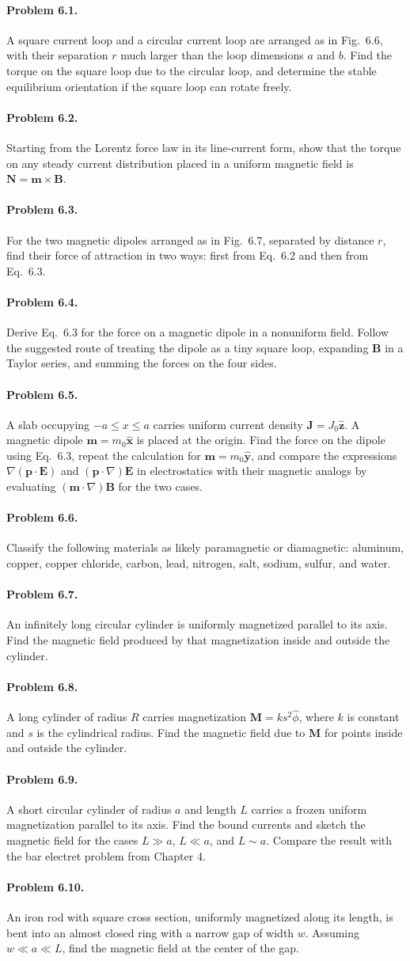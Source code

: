 \documentclass{aa}
\newcommand{\problemstatement}[2]{%
\paragraph{Problem #1.}#2\par\medskip
}
\begin{document}
\problemstatement{6.1}{A square current loop and a circular current loop are arranged as in Fig.~6.6, with their separation \(r\) much larger than the loop dimensions \(a\) and \(b\). Find the torque on the square loop due to the circular loop, and determine the stable equilibrium orientation if the square loop can rotate freely.}
\problemstatement{6.2}{Starting from the Lorentz force law in its line-current form, show that the torque on any steady current distribution placed in a uniform magnetic field is \(\mathbf N = \mathbf m\times\mathbf B\).}
\problemstatement{6.3}{For the two magnetic dipoles arranged as in Fig.~6.7, separated by distance \(r\), find their force of attraction in two ways: first from Eq.~6.2 and then from Eq.~6.3.}
\problemstatement{6.4}{Derive Eq.~6.3 for the force on a magnetic dipole in a nonuniform field. Follow the suggested route of treating the dipole as a tiny square loop, expanding \(\mathbf B\) in a Taylor series, and summing the forces on the four sides.}
\problemstatement{6.5}{A slab occupying \(-a \le x \le a\) carries uniform current density \(\mathbf J = J_0\hat{\mathbf z}\). A magnetic dipole \(\mathbf m = m_0\hat{\mathbf x}\) is placed at the origin. Find the force on the dipole using Eq.~6.3, repeat the calculation for \(\mathbf m = m_0\hat{\mathbf y}\), and compare the expressions \(\nabla(\mathbf p\cdot\mathbf E)\) and \((\mathbf p\cdot\nabla)\mathbf E\) in electrostatics with their magnetic analogs by evaluating \((\mathbf m\cdot\nabla)\mathbf B\) for the two cases.}
\problemstatement{6.6}{Classify the following materials as likely paramagnetic or diamagnetic: aluminum, copper, copper chloride, carbon, lead, nitrogen, salt, sodium, sulfur, and water.}
\problemstatement{6.7}{An infinitely long circular cylinder is uniformly magnetized parallel to its axis. Find the magnetic field produced by that magnetization inside and outside the cylinder.}
\problemstatement{6.8}{A long cylinder of radius \(R\) carries magnetization \(\mathbf M = ks^2\hat{\phi}\), where \(k\) is constant and \(s\) is the cylindrical radius. Find the magnetic field due to \(\mathbf M\) for points inside and outside the cylinder.}
\problemstatement{6.9}{A short circular cylinder of radius \(a\) and length \(L\) carries a frozen uniform magnetization parallel to its axis. Find the bound currents and sketch the magnetic field for the cases \(L\gg a\), \(L\ll a\), and \(L\sim a\). Compare the result with the bar electret problem from Chapter 4.}
\problemstatement{6.10}{An iron rod with square cross section, uniformly magnetized along its length, is bent into an almost closed ring with a narrow gap of width \(w\). Assuming \(w\ll a\ll L\), find the magnetic field at the center of the gap.}
\end{document}
